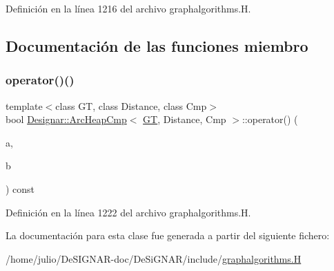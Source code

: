 Definición en la línea 1216 del archivo graphalgorithms.\+H.



\subsection{Documentación de las funciones miembro}
\mbox{\label{class_designar_1_1_arc_heap_cmp_a9d86fd876bad098a0a6844e9b302f141}} 
\subsubsection{\texorpdfstring{operator()()}{operator()()}}
{\footnotesize\ttfamily template$<$class GT, class Distance, class Cmp$>$ \\
bool \hyperlink{class_designar_1_1_arc_heap_cmp}{Designar\+::\+Arc\+Heap\+Cmp}$<$ \hyperlink{demo-buildgraph_8_c_a3001c40d2c31ca87ed96cd7d1334a55e}{GT}, Distance, Cmp $>$\+::operator() (\begin{DoxyParamCaption}\item[{typename G\+T\+::\+Arc $\ast$}]{a,  }\item[{typename G\+T\+::\+Arc $\ast$}]{b }\end{DoxyParamCaption}) const\hspace{0.3cm}{\ttfamily [inline]}}



Definición en la línea 1222 del archivo graphalgorithms.\+H.



La documentación para esta clase fue generada a partir del siguiente fichero\+:\begin{DoxyCompactItemize}
\item 
/home/julio/\+De\+S\+I\+G\+N\+A\+R-\/doc/\+De\+Si\+G\+N\+A\+R/include/\hyperlink{graphalgorithms_8_h}{graphalgorithms.\+H}\end{DoxyCompactItemize}
